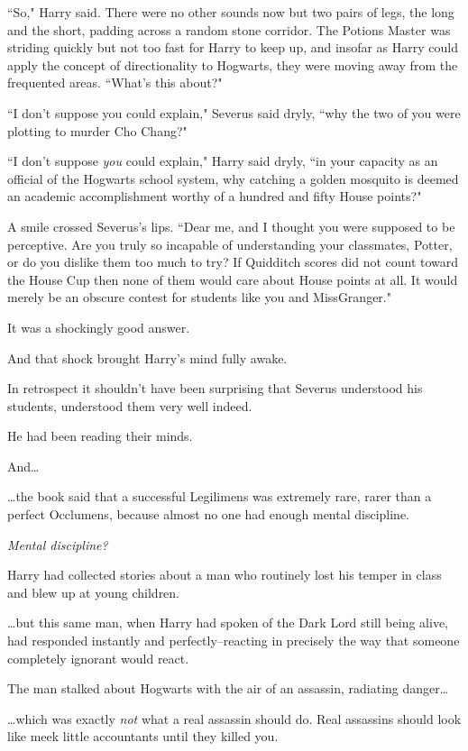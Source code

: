 \later

``So," Harry said. There were no other sounds now but two pairs of legs, the long and the short, padding across a random stone corridor. The Potions Master was striding quickly but not too fast for Harry to keep up, and insofar as Harry could apply the concept of directionality to Hogwarts, they were moving away from the frequented areas. ``What's this about?"

``I don't suppose you could explain," Severus said dryly, ``why the two of you were plotting to murder Cho Chang?"

``I don't suppose \emph{you} could explain," Harry said dryly, ``in your capacity as an official of the Hogwarts school system, why catching a golden mosquito is deemed an academic accomplishment worthy of a hundred and fifty House points?"

A smile crossed Severus's lips. ``Dear me, and I thought you were supposed to be perceptive. Are you truly so incapable of understanding your classmates, Potter, or do you dislike them too much to try? If Quidditch scores did not count toward the House Cup then none of them would care about House points at all. It would merely be an obscure contest for students like you and Miss\?Granger."

It was a shockingly good answer.

And that shock brought Harry's mind fully awake.

In retrospect it shouldn't have been surprising that Severus understood his students, understood them very well indeed.

He had been reading their minds.

And{\ldots}

{\ldots}the book said that a successful Legilimens was extremely rare, rarer than a perfect Occlumens, because almost no one had enough mental discipline.

\emph{Mental discipline?}

Harry had collected stories about a man who routinely lost his temper in class and blew up at young children.

{\ldots}but this same man, when Harry had spoken of the Dark Lord still being alive, had responded instantly and perfectly\---reacting in precisely the way that someone completely ignorant would react.

The man stalked about Hogwarts with the air of an assassin, radiating danger{\ldots}

{\ldots}which was exactly \emph{not} what a real assassin should do. Real assassins should look like meek little accountants until they killed you.

